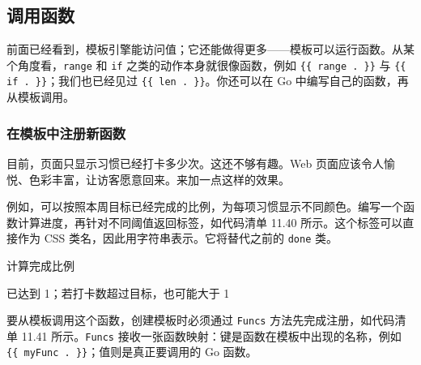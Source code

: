 \subsection{调用函数}
\label{sec:ch11-template-functions}

前面已经看到，模板引擎能访问值；它还能做得更多——模板可以运行函数。从某个角度看，\texttt{range} 和 \texttt{if} 之类的动作本身就很像函数，例如 \texttt{\{\{ range . \}\}} 与 \texttt{\{\{ if . \}\}}；我们也已经见过 \texttt{\{\{ len . \}\}}。你还可以在 Go 中编写自己的函数，再从模板调用。

\subsubsection{在模板中注册新函数}

目前，页面只显示习惯已经打卡多少次。这还不够有趣。Web 页面应该令人愉悦、色彩丰富，让访客愿意回来。来加一点这样的效果。

例如，可以按照本周目标已经完成的比例，为每项习惯显示不同颜色。编写一个函数计算进度，再针对不同阈值返回标签，如代码清单 11.40 所示。这个标签可以直接作为 CSS 类名，因此用字符串表示。它将替代之前的 \texttt{done} 类。


\begin{codeannotations}
\item 计算完成比例
\item 已达到 1；若打卡数超过目标，也可能大于 1
\end{codeannotations}

要从模板调用这个函数，创建模板时必须通过 \texttt{Funcs} 方法先完成注册，如代码清单 11.41 所示。\texttt{Funcs} 接收一张函数映射：键是函数在模板中出现的名称，例如 \texttt{\{\{ myFunc . \}\}}；值则是真正要调用的 Go 函数。


